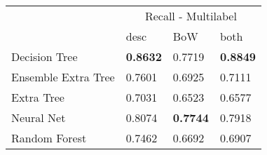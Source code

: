 \begin{tabular}{|l|l|l|l| }
\hline
 &  \multicolumn{3}{c|}{Recall - Multilabel} \\
\cline{2-4} & desc & BoW & both \\ \hline
Decision Tree       & {\bf 0.8632} & 0.7719 & {\bf 0.8849}\\
Ensemble Extra Tree & 0.7601 & 0.6925 & 0.7111\\
Extra Tree          & 0.7031 & 0.6523 & 0.6577\\
Neural Net          & 0.8074 & {\bf 0.7744} & 0.7918\\
Random Forest       & 0.7462 & 0.6692 & 0.6907\\
\hline
\end{tabular}